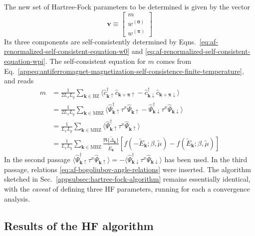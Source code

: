 The new set of Hartree-Fock parameters to be determined is given by the vector
\[
	\mathbf{v} \equiv \begin{bmatrix}
		 m \\ w^{(\mathbf{0})} \\ w^{(\bm{\pi})}
	\end{bmatrix}
\]
Its three components are self-consistently determined by Eqns.~\eqref{eq:af-renormalized-self-consistent-equation-w0} and \eqref{eq:af-renormalized-self-consistent-equation-wpi}. The self-consistent equation for $m$ comes from Eq.~\eqref{appeq:antiferromagnet-magnetization-self-consistence-finite-temperature}, and reads
\begin{align}
	m &= \frac{1}{2L_xL_y} \sum_{\mathbf{k} \in \mathrm{BZ}} \langle
		\hat c_{\mathbf{k}\uparrow}^\dagger  \hat c_{\mathbf{k}+\bm{\pi}\uparrow} - \hat c_{\mathbf{k}\downarrow}^\dagger  \hat c_{\mathbf{k}+\bm{\pi}\downarrow}
	\rangle \nonumber \\
	&= \frac{1}{2L_xL_y} \sum_{\mathbf{k} \in \mathrm{MBZ}} \langle
		\hat \Psi_{\mathbf{k}\uparrow}^\dagger \tau^x \hat \Psi_{\mathbf{k}\uparrow} - \hat \Psi_{\mathbf{k}\downarrow}^\dagger \tau^x \hat \Psi_{\mathbf{k}\downarrow}
	\rangle \nonumber \\
	&= \frac{1}{L_xL_y} \sum_{\mathbf{k} \in \mathrm{MBZ}} \langle
		\hat \Psi_{\mathbf{k}\uparrow}^\dagger \tau^x \hat \Psi_{\mathbf{k}\uparrow}
	\rangle \nonumber \\
	&= \frac{1}{L_xL_y} \sum_{\mathbf{k} \in \mathrm{MBZ}} \frac{\Re\{\tilde{\Delta}_\mathbf{k}\}}{\tilde{E}_\mathbf{k}} \left[
		f\left(
			-\tilde{E}_\mathbf{k};\beta,\tilde{\mu}
		\right) - f\left(
			\tilde{E}_\mathbf{k};\beta,\tilde{\mu}
		\right)
	\right]
	\label{eq:af-renormalized-self-consistent-equation-m}
\end{align}
In the second passage $\langle \hat \Psi_{\mathbf{k}\uparrow}^\dagger \tau^x \hat \Psi_{\mathbf{k}\uparrow} \rangle = - \langle \hat \Psi_{\mathbf{k}\downarrow}^\dagger \tau^x \hat \Psi_{\mathbf{k}\downarrow} \rangle$ has been used. In the third passage, relations \eqref{eq:af-bogoliubov-angle-relations} were inserted. The algorithm sketched in Sec.~\ref{appsubsec:hartree-fock-algorithm} remains essentially identical, with the \textit{caveat} of defining three HF parameters, running for each a convergence analysis.

\subsection{Results of the HF algorithm}

